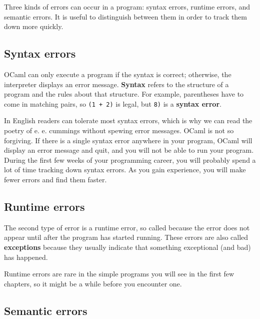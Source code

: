 \documentclass[10pt]{book}
\begin{document}

Three kinds of errors can occur in a program: syntax errors, runtime errors, and semantic errors. It is useful 
to distinguish between them in order to track them down more quickly.

\subsection{Syntax errors}

OCaml can only execute a program if the syntax is correct; otherwise, the interpreter displays an error message.  
{\bf Syntax} refers to the structure of a program and the rules about that structure. For example, parentheses 
have to come in matching pairs, so {\tt (1 + 2)} is legal, but {\tt 8)} is a {\bf syntax error}.


In English readers can tolerate most syntax errors, which is why we can read the poetry of e. e. cummings without 
spewing error messages. OCaml is not so forgiving.  If there is a single syntax error anywhere in your program, 
OCaml will display an error message and quit, and you will not be able to run your program. During the first few 
weeks of your programming career, you will probably spend a lot of time tracking down syntax errors.  As you gain 
experience, you will make fewer errors and find them faster.

\subsection{Runtime errors}
\label{runtime}

The second type of error is a runtime error, so called because the error does not appear until after the 
program has started running. These errors are also called {\bf exceptions} because they usually indicate 
that something exceptional (and bad) has happened.

Runtime errors are rare in the simple programs you will see in the first few chapters, so it might be a 
while before you encounter one.

\subsection{Semantic errors}
\end{document}
